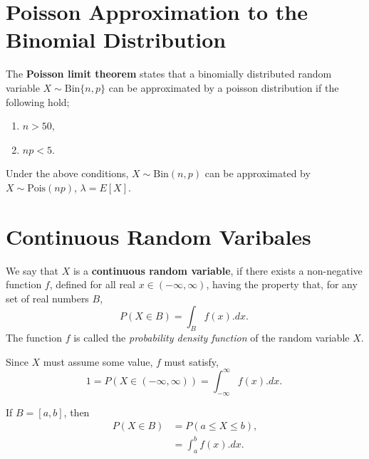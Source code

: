 \section {Poisson Approximation to the Binomial Distribution} \label{mod2:section:PoissonApproxBinomial}
 
 \begin{defn} \label{mod2:defn:PoissonApproxBinomial}
The \textbf{Poisson limit theorem} states that a binomially distributed random variable $X \sim \text{Bin}\{n, p\}$ can be approximated by a poisson distribution if the following hold;
\begin{enumerate}[label = (\roman*)]
	\item $n > 50$,
	\item $np < 5$.
\end{enumerate}

Under the above conditions, $X \sim \text{Bin}(n, p)$ can be approximated by $X \sim \text{Pois}(np)$, $\lambda = E[X]$.

\end{defn}
	


\section{Continuous Random Varibales} \label{mod2:section:ContinuousRandomVar}

\begin{defn} \label{mod2:defn:ContinuousRandomVar}
	We say that $X$ is a \textbf{continuous random variable}, if there exists a non-negative function $f$, defined for all real $x \in (-\infty,\infty)$, having the property that, for any set of real numbers $B$,
	\begin{equation}
	P(X \in B) = \int_B f(x).dx. \
	\end{equation}
	The function $f$ is called the \textit{probability density function} of the random variable $X$.
\end{defn}


\begin{prop} \label{mod2:prop:ContinuousRV:1}
	Since $X$ must assume some value, $f$ must satisfy,
	\begin{equation}
	1 = P(X \in (-\infty,\infty)) = \int_{-\infty}^{\infty} f(x).dx.  \
	\end{equation}
\end{prop}

\begin{note} \label{mod2:note:ContinuousRV:Note1}
	If $B=[a,b]$, then
	\begin{align}
	P(X\in B) &= P(a \leq X \leq b), \\
	&= \int_a^b f(x) .dx. \
	\end{align}
\end{note}

